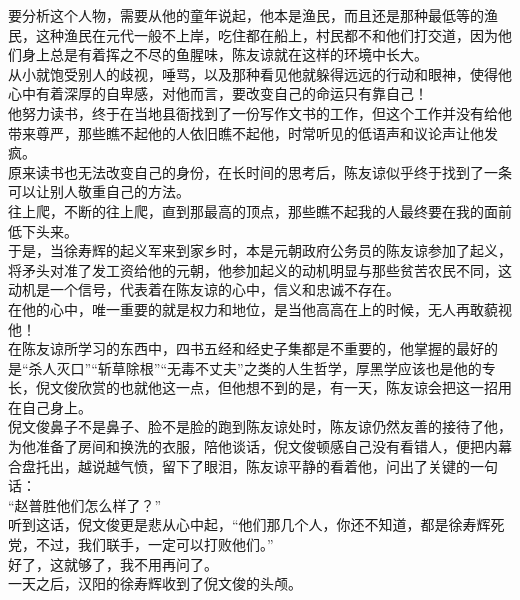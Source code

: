 \begin{multicols}{\theparacolNo}
要分析这个人物，需要从他的童年说起，他本是渔民，而且还是那种最低等的渔民，这种渔民在元代一般不上岸，吃住都在船上，村民都不和他们打交道，因为他们身上总是有着挥之不尽的鱼腥味，陈友谅就在这样的环境中长大。\\

从小就饱受别人的歧视，唾骂，以及那种看见他就躲得远远的行动和眼神，使得他心中有着深厚的自卑感，对他而言，要改变自己的命运只有靠自己！\\

他努力读书，终于在当地县衙找到了一份写作文书的工作，但这个工作并没有给他带来尊严，那些瞧不起他的人依旧瞧不起他，时常听见的低语声和议论声让他发疯。\\

原来读书也无法改变自己的身份，在长时间的思考后，陈友谅似乎终于找到了一条可以让别人敬重自己的方法。\\

往上爬，不断的往上爬，直到那最高的顶点，那些瞧不起我的人最终要在我的面前低下头来。\\

于是，当徐寿辉的起义军来到家乡时，本是元朝政府公务员的陈友谅参加了起义，将矛头对准了发工资给他的元朝，他参加起义的动机明显与那些贫苦农民不同，这动机是一个信号，代表着在陈友谅的心中，信义和忠诚不存在。\\

在他的心中，唯一重要的就是权力和地位，是当他高高在上的时候，无人再敢藐视他！\\

在陈友谅所学习的东西中，四书五经和经史子集都是不重要的，他掌握的最好的是“杀人灭口”“斩草除根”“无毒不丈夫”之类的人生哲学，厚黑学应该也是他的专长，倪文俊欣赏的也就他这一点，但他想不到的是，有一天，陈友谅会把这一招用在自己身上。\\

倪文俊鼻子不是鼻子、脸不是脸的跑到陈友谅处时，陈友谅仍然友善的接待了他，为他准备了房间和换洗的衣服，陪他谈话，倪文俊顿感自己没有看错人，便把内幕合盘托出，越说越气愤，留下了眼泪，陈友谅平静的看着他，问出了关键的一句话：\\

“赵普胜他们怎么样了？”\\

听到这话，倪文俊更是悲从心中起，“他们那几个人，你还不知道，都是徐寿辉死党，不过，我们联手，一定可以打败他们。”\\

好了，这就够了，我不用再问了。\\

一天之后，汉阳的徐寿辉收到了倪文俊的头颅。\\
\ifnum{}
	\end{multicols}
\fi
\newpage
